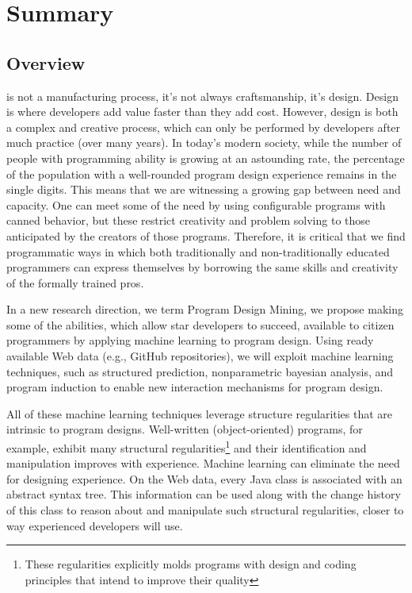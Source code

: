 \chapter{Summary}{}
\label{sec:intro}

\section*{Overview} %
\label{sec:overview}

 is not a manufacturing process, it's not 
always craftsmanship, it's design. Design is where developers add 
value faster than they add cost. However, design is both a complex 
and creative process, which can only be performed by developers after 
much practice (over many years). In today’s modern society, while the 
number of people with programming ability is growing at an astounding 
rate, the percentage of the population with a well-rounded program 
design experience remains in the single digits. This means that we are 
witnessing a growing gap between need and capacity. One can meet some of 
the need by using configurable programs with canned behavior, but these 
restrict creativity and problem solving to those anticipated by the 
creators of those programs. Therefore, it is critical that we find 
programmatic ways in which both traditionally and non-traditionally 
educated programmers can express themselves by borrowing the same skills 
and creativity of the formally trained pros.

In a new research direction, we term Program Design Mining, we propose  
making some of the abilities, which allow star developers to succeed, 
available to citizen programmers by applying machine learning to program 
design.  Using ready available Web data (e.g., GitHub 
repositories), we will exploit machine learning techniques, such as 
structured prediction, nonparametric bayesian analysis, and program 
induction to enable new interaction mechanisms for program design.

All of these machine learning techniques leverage structure regularities 
that are intrinsic to program designs. Well-written (object-oriented) programs, 
for example, exhibit many structural regularities\footnote{These regularities explicitly molds programs with design and coding principles that intend to improve their quality} and their identification and manipulation improves with experience. Machine 
learning can eliminate the need for designing experience. On the Web data, 
every Java class is associated with an abstract syntax tree. This information 
can be used along with the change history of this class to reason about and 
manipulate such structural regularities, closer to way experienced developers 
will use. 

